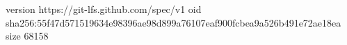 version https://git-lfs.github.com/spec/v1
oid sha256:55f47d571519634e98396ae98d899a76107eaf900fcbea9a526b491e72ae18ea
size 68158

